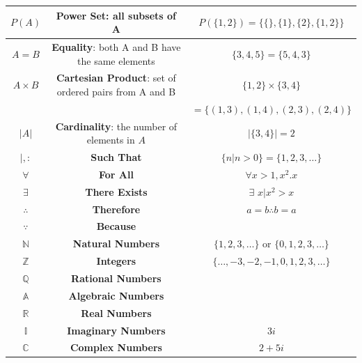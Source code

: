 \begin{center}
\begin{tabular}{|c|c|c|}
                $P(A)$ & \textbf{Power Set}: all subsets of A & $P(\{1,2\})=\{\{\},\{1\},\{2\},\{1,2\}\}$ \\ \hline
                $A=B$ & \textbf{Equality}: both A and B have the same elements & $\{3,4,5\}=\{5,4,3\}$ \\ \hline
                $A\times B$ & \textbf{Cartesian Product}: set of ordered pairs from A and B & $\{1,2\}\times\{3,4\}$ \\
                & & $=\{(1,3),(1,4),(2,3),(2,4)\}$  \\ \hline
                $|A|$ & \textbf{Cardinality}: the number of elements in $A$ & $|\{3,4\}|=2$ \\ \hline
                $|,:$ & \textbf{Such That} & $\{n|n>0\}=\{1,2,3,\dots\}$ \\ \hline
                $\forall$ & \textbf{For All} & $\forall x>1,x^2.x$ \\ \hline
                $\exists$ & \textbf{There Exists} & $\exists$  $x|x^2>x$ \\ \hline
                $\therefore$ & \textbf{Therefore} & $a=b \therefore b =a$ \\ \hline
                $\because$ & \textbf{Because} & \\ \hline
                $\mathbb{N}$ & \textbf{Natural Numbers} & $\{1,2,3,\dots\}$ or $\{0,1,2,3,\dots\}$ \\ \hline
                $\mathbb{Z}$ & \textbf{Integers} & $\{\dots,-3,-2,-1,0,1,2,3,\dots\}$ \\ \hline
                $\mathbb{Q}$ & \textbf{Rational Numbers} & \\ \hline
                $\mathbb{A}$ & \textbf{Algebraic Numbers} & \\ \hline
                $\mathbb{R}$ & \textbf{Real Numbers} & \\ \hline
                $\mathbb{I}$ & \textbf{Imaginary Numbers} & $3i$ \\ \hline
                $\mathbb{C}$ & \textbf{Complex Numbers} & $2+5i$ \\ \hline
            \end{tabular}
        \end{center}



